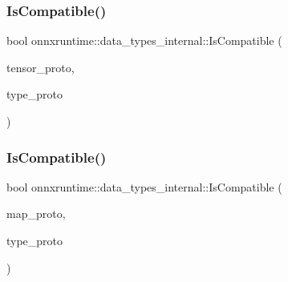 \mbox{\label{namespaceonnxruntime_1_1data__types__internal_ab1bc69f6e946f482e57c5837d3f06f4a}} 
\subsubsection{\texorpdfstring{Is\+Compatible()}{IsCompatible()}\hspace{0.1cm}{\footnotesize\ttfamily [2/5]}}
{\footnotesize\ttfamily bool onnxruntime\+::data\+\_\+types\+\_\+internal\+::\+Is\+Compatible (\begin{DoxyParamCaption}\item[{const O\+N\+N\+X\+\_\+\+N\+A\+M\+E\+S\+P\+A\+C\+E\+::\+Type\+Proto\+\_\+\+Sparse\+Tensor \&}]{tensor\+\_\+proto,  }\item[{const O\+N\+N\+X\+\_\+\+N\+A\+M\+E\+S\+P\+A\+C\+E\+::\+Type\+Proto\+\_\+\+Sparse\+Tensor \&}]{type\+\_\+proto }\end{DoxyParamCaption})}

\mbox{\label{namespaceonnxruntime_1_1data__types__internal_aece255300cd5b81ed09517ea20130c58}} 
\subsubsection{\texorpdfstring{Is\+Compatible()}{IsCompatible()}\hspace{0.1cm}{\footnotesize\ttfamily [3/5]}}
{\footnotesize\ttfamily bool onnxruntime\+::data\+\_\+types\+\_\+internal\+::\+Is\+Compatible (\begin{DoxyParamCaption}\item[{const O\+N\+N\+X\+\_\+\+N\+A\+M\+E\+S\+P\+A\+C\+E\+::\+Type\+Proto\+\_\+\+Map \&}]{map\+\_\+proto,  }\item[{const O\+N\+N\+X\+\_\+\+N\+A\+M\+E\+S\+P\+A\+C\+E\+::\+Type\+Proto\+\_\+\+Map \&}]{type\+\_\+proto }\end{DoxyParamCaption})}

